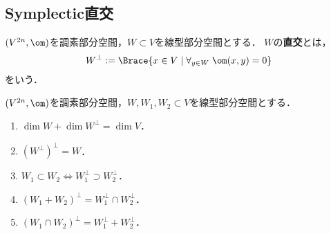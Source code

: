 \documentclass[uplatex,dvipdfmx]{jsreport}
\begin{document}
\subsection{Symplectic直交}

\begin{definition}
    $(V^{2n},\om)$を調素部分空間，$W\subset V$を線型部分空間とする．
    $W$の\textbf{直交}とは，
    \[W^\perp:=\Brace{x\in V\mid\forall_{y\in W}\;\om(x,y)=0}\]
    をいう．
\end{definition}

\begin{proposition}
    $(V^{2n},\om)$を調素部分空間，$W,W_1,W_2\subset V$を線型部分空間とする．
    \begin{enumerate}
        \item $\dim W+\dim W^\perp=\dim V$．
        \item $(W^\perp)^\perp=W$．
        \item $W_1\subset W_2\Leftrightarrow W_1^\perp\supset W_2^\perp$．
        \item $(W_1+W_2)^\perp=W_1^\perp\cap W_2^\perp$．
        \item $(W_1\cap W_2)^\perp=W_1^\perp+W_2^\perp$．
    \end{enumerate}
\end{proposition}
\end{document}
